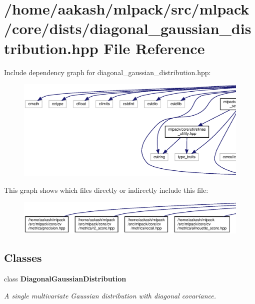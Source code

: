 \section{/home/aakash/mlpack/src/mlpack/core/dists/diagonal\+\_\+gaussian\+\_\+distribution.hpp File Reference}
\label{diagonal__gaussian__distribution_8hpp}
Include dependency graph for diagonal\+\_\+gaussian\+\_\+distribution.\+hpp\+:
\nopagebreak
\begin{figure}[H]
\begin{center}
\leavevmode
\includegraphics[width=350pt]{diagonal__gaussian__distribution_8hpp__incl}
\end{center}
\end{figure}
This graph shows which files directly or indirectly include this file\+:
\nopagebreak
\begin{figure}[H]
\begin{center}
\leavevmode
\includegraphics[width=350pt]{diagonal__gaussian__distribution_8hpp__dep__incl}
\end{center}
\end{figure}
\subsection*{Classes}
\begin{DoxyCompactItemize}
\item 
class \textbf{ Diagonal\+Gaussian\+Distribution}
\begin{DoxyCompactList}\small\item\em A single multivariate Gaussian distribution with diagonal covariance. \end{DoxyCompactList}\end{DoxyCompactItemize}

